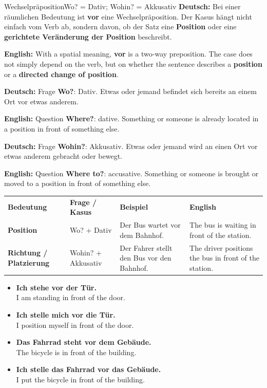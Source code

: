 \documentclass[a4paper,11pt]{article}
\newcommand{\GermanText}[1]{\textbf{Deutsch: }#1\par}
\newcommand{\EnglishText}[1]{{\small\color{SoftGray}\textbf{English: }#1\par}}
\newcommand{\ExampleItem}[2]{\item \textbf{#1}\\{\small\color{SoftGray}#2}}
\begin{document}
        \begin{grammarentry}{Wechselpräposition}{Wo? = Dativ; Wohin? = Akkusativ}
            \GermanText{Bei einer räumlichen Bedeutung ist \textbf{vor} eine Wechselpräposition. Der Kasus hängt nicht einfach vom Verb ab, sondern davon, ob der Satz eine \textbf{Position} oder eine \textbf{gerichtete Veränderung der Position} beschreibt.}
            \EnglishText{With a spatial meaning, \textbf{vor} is a two-way preposition. The case does not simply depend on the verb, but on whether the sentence describes a \textbf{position} or a \textbf{directed change of position}.}

            \GermanText{Frage \textbf{Wo?}: Dativ. Etwas oder jemand befindet sich bereits an einem Ort vor etwas anderem.}
            \EnglishText{Question \textbf{Where?}: dative. Something or someone is already located in a position in front of something else.}

            \GermanText{Frage \textbf{Wohin?}: Akkusativ. Etwas oder jemand wird an einen Ort vor etwas anderem gebracht oder bewegt.}
            \EnglishText{Question \textbf{Where to?}: accusative. Something or someone is brought or moved to a position in front of something else.}
        \end{grammarentry}

        \begin{longtable}{>{\bfseries}p{2.5cm}p{3cm}p{4.8cm}p{4.1cm}}
            \rowcolor{HeaderBlueDark}
            \color{white}\textbf{Bedeutung} &
            \color{white}\textbf{Frage / Kasus} &
            \color{white}\textbf{Beispiel} &
            \color{white}\textbf{English} \\
            Position & Wo? + Dativ & Der Bus wartet vor dem Bahnhof. & The bus is waiting in front of the station. \\
            Richtung / Platzierung & Wohin? + Akkusativ & Der Fahrer stellt den Bus vor den Bahnhof. & The driver positions the bus in front of the station. \\
        \end{longtable}

        \begin{exbox}
            \begin{itemize}
                \ExampleItem{Ich stehe vor der Tür.}{I am standing in front of the door.}
                \ExampleItem{Ich stelle mich vor die Tür.}{I position myself in front of the door.}
                \ExampleItem{Das Fahrrad steht vor dem Gebäude.}{The bicycle is in front of the building.}
                \ExampleItem{Ich stelle das Fahrrad vor das Gebäude.}{I put the bicycle in front of the building.}
            \end{itemize}
        \end{exbox}
\end{document}

